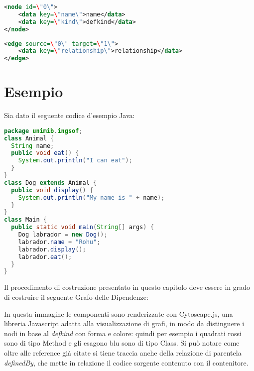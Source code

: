 \begin{lstlisting}[language=XML, caption=esempio di nodo]
<node id=\"0\">
    <data key=\"name\">name</data>
    <data key=\"kind\">defkind</data>
</node>
\end{lstlisting}

\begin{lstlisting}[language=XML, caption=esempio di arco]
<edge source=\"0\" target=\"1\">
    <data key=\"relationship\">relationship</data>
</edge>
\end{lstlisting}

\section{Esempio}

Sia dato il seguente codice d'esempio Java:

\begin{lstlisting}[language=Java]
package unimib.ingsof;
class Animal {
  String name;
  public void eat() {
    System.out.println("I can eat");
  }
}
class Dog extends Animal {
  public void display() {
    System.out.println("My name is " + name);
  }
}
class Main {
  public static void main(String[] args) {
    Dog labrador = new Dog();
    labrador.name = "Rohu";
    labrador.display();
    labrador.eat();
  }
}
\end{lstlisting}

Il procedimento di costruzione presentato in questo capitolo deve essere in grado di costruire il seguente Grafo delle Dipendenze:


In questa immagine le componenti sono renderizzate con Cytoscape.js, una libreria Javascript adatta alla visualizzazione di grafi, in modo da distinguere i nodi in base al \emph{defkind} con forma e colore: quindi per esempio i quadrati rossi sono di tipo Method e gli esagono blu sono di tipo Class.
Si pu\`o notare come oltre alle reference gi\`a citate si tiene traccia anche della relazione di parentela \emph{definedBy}, che mette in relazione il codice sorgente contenuto con il contenitore.
